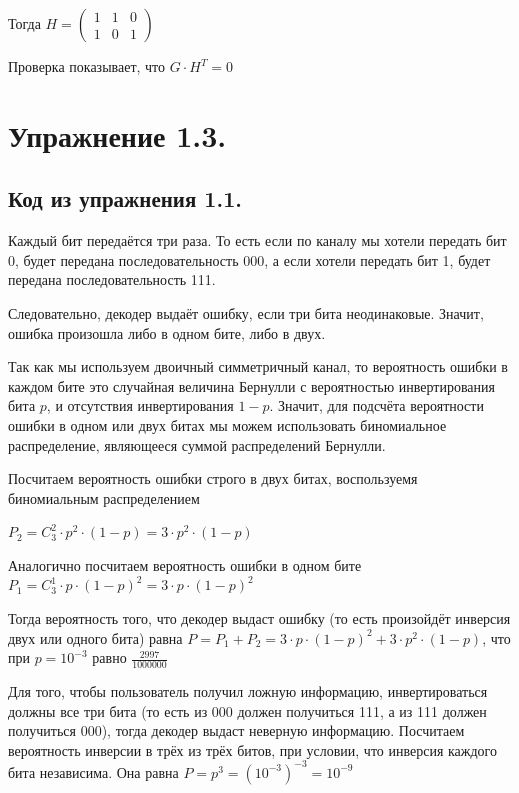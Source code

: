 \documentclass{article}
\begin{document}
	Тогда $H = \left(
	\begin{array}{cccccccccc}
	1 & 1 & 0\\
	1 & 0 & 1
	\end{array}
	\right)$
	
	Проверка показывает, что $G \cdot H^T = 0$
	
	\section{Упражнение 1.3.}
	
	\subsection{Код из упражнения 1.1.}
	
	Каждый бит передаётся три раза. То есть если по каналу мы хотели передать бит 0, будет передана последовательность 000, а если хотели передать бит 1, будет передана последовательность 111.
	
	Следовательно, декодер выдаёт ошибку, если три бита неодинаковые. Значит, ошибка произошла либо в одном бите, либо в двух. 
	
	Так как мы используем двоичный симметричный канал, то вероятность ошибки в каждом бите это случайная величина Бернулли с вероятностью инвертирования бита $p$, и отсутствия инвертирования $1 - p$. Значит, для подсчёта вероятности ошибки в одном или двух битах мы можем использовать биномиальное распределение, являющееся суммой распределений Бернулли.
	
	Посчитаем вероятность ошибки строго в двух битах, воспользуемя биномиальным распределением
	
	$P_2 = C^2_3 \cdot p^2 \cdot (1 - p) = 3 \cdot p^2 \cdot (1 - p) $
	
	Аналогично посчитаем вероятность ошибки в одном бите 
	$P_1 = C^1_3 \cdot p \cdot (1 - p)^2 = 3 \cdot p \cdot (1 - p)^2 $
	
	Тогда вероятность того, что декодер выдаст ошибку (то есть произойдёт инверсия двух или одного бита) равна $P = P_1 + P_2 = 3 \cdot p \cdot (1 - p)^2 +  3 \cdot p^2 \cdot (1 - p)$, что при $p = 10^{-3}$ равно $\frac{2997}{1000000}$
	
	Для того, чтобы пользователь получил ложную информацию, инвертироваться должны все три бита (то есть из 000 должен получиться 111, а из 111 должен получиться 000), тогда декодер выдаст неверную информацию. Посчитаем вероятность инверсии в трёх из трёх битов, при условии, что инверсия каждого бита независима. Она равна $P = p^3 = (10^{-3})^{-3} = 10^{-9}$
	
\end{document}
